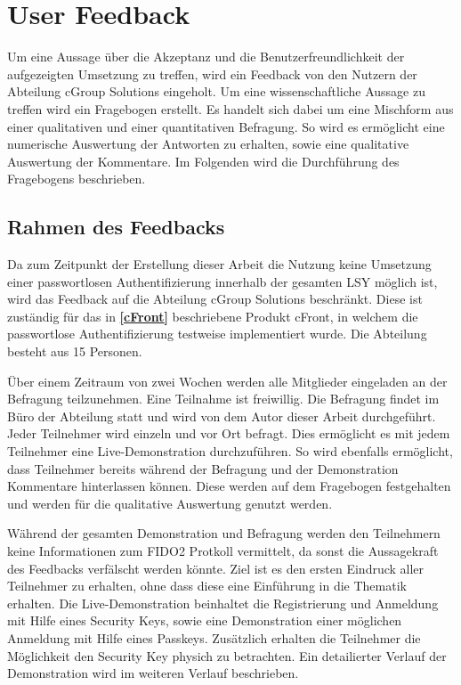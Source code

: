 \section{User Feedback}
Um eine Aussage über die Akzeptanz und die Benutzerfreundlichkeit der aufgezeigten Umsetzung zu treffen, wird ein Feedback von den Nutzern der Abteilung cGroup Solutions eingeholt. Um eine wissenschaftliche Aussage zu treffen wird ein Fragebogen erstellt. Es handelt sich dabei um eine Mischform aus einer qualitativen und einer quantitativen Befragung. So wird es ermöglicht eine numerische Auswertung der Antworten zu erhalten, sowie eine qualitative Auswertung der Kommentare. Im Folgenden wird die Durchführung des Fragebogens beschrieben.

\subsection{Rahmen des Feedbacks}
Da zum Zeitpunkt der Erstellung dieser Arbeit die Nutzung keine Umsetzung einer passwortlosen Authentifizierung innerhalb der gesamten \ac{LSY} möglich ist, wird das Feedback auf die Abteilung cGroup Solutions beschränkt. Diese ist zuständig für das in \textbf{\ref{cFront}} beschriebene Produkt cFront, in welchem die passwortlose Authentifizierung testweise implementiert wurde. Die Abteilung besteht aus 15 Personen.

Über einem Zeitraum von zwei Wochen werden alle Mitglieder eingeladen an der Befragung teilzunehmen. Eine Teilnahme ist freiwillig. Die Befragung findet im Büro der Abteilung statt und wird von dem Autor dieser Arbeit durchgeführt. Jeder Teilnehmer wird einzeln und vor Ort befragt. Dies ermöglicht es mit jedem Teilnehmer eine Live-Demonstration durchzuführen. So wird ebenfalls ermöglicht, dass Teilnehmer bereits während der Befragung und der Demonstration Kommentare hinterlassen können. Diese werden auf dem Fragebogen festgehalten und werden für die qualitative Auswertung genutzt werden.

Während der gesamten Demonstration und Befragung werden den Teilnehmern keine Informationen zum FIDO2 Protkoll vermittelt, da sonst die Aussagekraft des Feedbacks verfälscht werden könnte. Ziel ist es den ersten Eindruck aller Teilnehmer zu erhalten, ohne dass diese eine Einführung in die Thematik erhalten. Die Live-Demonstration beinhaltet die Registrierung und Anmeldung mit Hilfe eines Security Keys, sowie eine Demonstration einer möglichen Anmeldung mit Hilfe eines Passkeys. Zusätzlich erhalten die Teilnehmer die Möglichkeit den Security Key physich zu betrachten. Ein detailierter Verlauf der Demonstration wird im weiteren Verlauf beschrieben.

